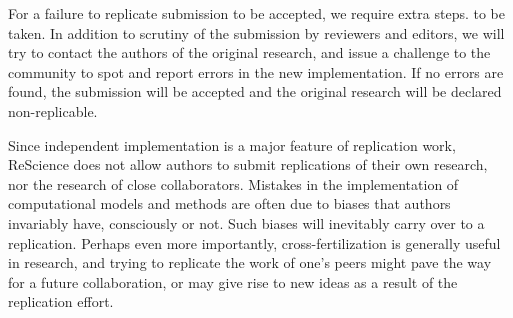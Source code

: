 \documentclass[a4paper,10pt, twocolumn]{article}
\begin{document}
For a failure to replicate submission to be accepted, we require extra steps.
to be taken. In addition to scrutiny of the submission by reviewers and
editors, we will try to contact the authors of the original research, and issue
a challenge to the community to spot and report errors in the new implementation.
If no errors are found, the submission will be accepted and the original
research will be declared non-replicable.

%

Since independent implementation is a major feature of replication
work, ReScience does not allow authors to submit replications of their
own research, nor the research of close collaborators. Mistakes in the
implementation of computational models and methods are often due to
biases that authors invariably have, consciously or not. Such biases
will inevitably carry over to a replication. Perhaps even more
importantly, cross-fertilization is generally useful in research, and
trying to replicate the work of one’s peers might pave the way for a
future collaboration, or may give rise to new ideas as a result of the
replication effort.




\end{document}
